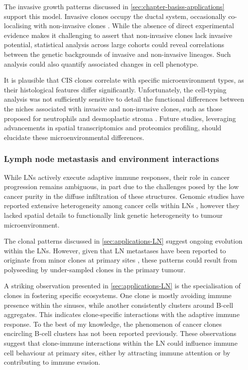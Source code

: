 The invasive growth patterns discussed in \cref{sec:chapter-basiss-applications} support this model. Invasive clones occupy the ductal system, occasionally co-localising with non-invasive clones . While the absence of direct experimental evidence makes it challenging to assert that non-invasive clones lack invasive potential, statistical analysis across large cohorts could reveal correlations between the genetic backgrounds of invasive and non-invasive lineages. Such analysis could also quantify associated changes in cell phenotype.

It is plausible that \ac{CIS} clones correlate with specific microenvironment types, as their histological features differ significantly. Unfortunately, the cell-typing analysis was not sufficiently sensitive to detail the functional differences between the niches associated with invasive and non-invasive clones, such as those proposed for neutrophils \parencite{Sinha2021-mf} and desmoplastic stroma \parencite{Risom2022-uw}. Future studies, leveraging advancements in spatial transcriptomics and proteomics profiling, should elucidate these microenvironmental differences.

\subsubsection*{Lymph node metastasis and environment interactions}

While \acfp{LN} actively execute adaptive immune responses, their role in cancer progression remains ambiguous, in part due to the challenges posed by the low cancer purity in the diffuse infiltration of these structures. Genomic studies have reported extensive heterogeneity among cancer cells within \acp{LN} \parencite{Pal2021-rf,Barry2018-el,Bao2018-kj}, however they lacked spatial details to functionally link genetic heterogeneity to tumour microenvironment.

The clonal patterns discussed in \cref{sec:applications-LN} suggest ongoing evolution within the \acp{LN}. However, given that \ac{LN} metastases have been reported to originate from minor clones at primary sites \parencite{Bao2018-kj}, these patterns could result from polyseeding by under-sampled clones in the primary tumour.

A striking observation presented in \cref{sec:applications-LN} is the specialisation of clones in fostering specific ecosystems. One clone is mostly avoiding immune presence within the sinuses, while another consistently clusters around B-cell aggregates. This indicates clone-specific interactions with the adaptive immune response. To the best of my knowledge, the phenomenon of cancer clones encircling B-cell clusters has not been reported previously. These observations suggest that clone-immune interactions within the \ac{LN} could influence immune cell behaviour at primary sites, either by attracting immune attention or by contributing to immune evasion.

